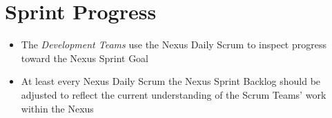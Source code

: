 \documentclass[a4paper,11pt,twocolumn]{article}
\begin{document}
\section*{Sprint Progress}
\begin{itemize}
	\item The \textit{Development Teams} use the Nexus Daily Scrum to inspect progress toward the Nexus Sprint Goal
	\item At least every Nexus Daily Scrum the Nexus Sprint Backlog should be adjusted to reflect the current understanding of the Scrum Teams' work within the Nexus
\end{itemize}

\nocite{*}


\end{document}

